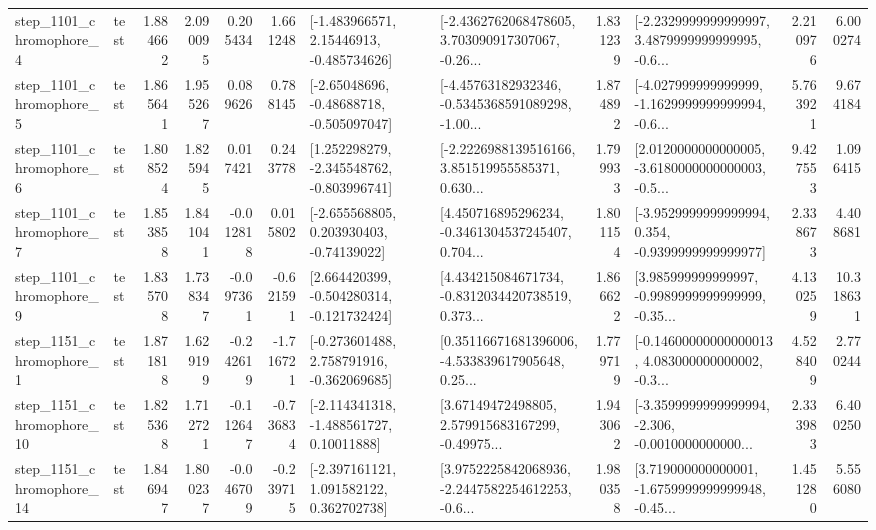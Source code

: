 \begin{tabular}{llrrrrllrlrr}
  step\_1101\_chromophore\_4 &      test &      1.884662 &    2.090095 &      0.205434 &  1.661248 &    [-1.483966571, 2.15446913, -0.485734626] &  [-2.4362762068478605, 3.703090917307067, -0.26... &       1.831239 &  [-2.2329999999999997, 3.4879999999999995, -0.6... &            2.210976 &          6.000274 \\
  step\_1101\_chromophore\_5 &      test &      1.865641 &    1.955267 &      0.089626 &  0.788145 &    [-2.65048696, -0.48688718, -0.505097047] &  [-4.45763182932346, -0.5345368591089298, -1.00... &       1.874892 &  [-4.027999999999999, -1.1629999999999994, -0.6... &            5.763921 &          9.674184 \\
  step\_1101\_chromophore\_6 &      test &      1.808524 &    1.825945 &      0.017421 &  0.243778 &   [1.252298279, -2.345548762, -0.803996741] &  [-2.2226988139516166, 3.851519955585371, 0.630... &       1.799933 &  [2.0120000000000005, -3.6180000000000003, -0.5... &            9.427553 &          1.096415 \\
  step\_1101\_chromophore\_7 &      test &      1.853858 &    1.841041 &     -0.012818 &  0.015802 &    [-2.655568805, 0.203930403, -0.74139022] &  [4.450716895296234, -0.3461304537245407, 0.704... &       1.801154 &  [-3.9529999999999994, 0.354, -0.9399999999999977] &            2.338673 &          4.408681 \\
  step\_1101\_chromophore\_9 &      test &      1.835708 &    1.738347 &     -0.097361 & -0.621591 &   [2.664420399, -0.504280314, -0.121732424] &  [4.434215084671734, -0.8312034420738519, 0.373... &       1.866622 &  [3.985999999999997, -0.9989999999999999, -0.35... &            4.130259 &         10.318631 \\
  step\_1151\_chromophore\_1 &      test &      1.871818 &    1.629199 &     -0.242619 & -1.716721 &   [-0.273601488, 2.758791916, -0.362069685] &  [0.35116671681396006, -4.533839617905648, 0.25... &       1.779719 &  [-0.14600000000000013, 4.083000000000002, -0.3... &            4.528409 &          2.770244 \\
 step\_1151\_chromophore\_10 &      test &      1.825368 &    1.712721 &     -0.112647 & -0.736834 &    [-2.114341318, -1.488561727, 0.10011888] &  [3.67149472498805, 2.579915683167299, -0.49975... &       1.943062 &  [-3.3599999999999994, -2.306, -0.0010000000000... &            2.333983 &          6.400250 \\
 step\_1151\_chromophore\_14 &      test &      1.846947 &    1.800237 &     -0.046709 & -0.239715 &    [-2.397161121, 1.091582122, 0.362702738] &  [3.9752225842068936, -2.2447582254612253, -0.6... &       1.980358 &  [3.719000000000001, -1.6759999999999948, -0.45... &            1.451280 &          5.556080 \\

\end{tabular}
